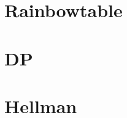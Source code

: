 \documentclass[a4paper]{report}
\begin{document}
\section*{Rainbowtable}

\newpage
\section*{DP}

\newpage
\section*{Hellman}

\end{document}
